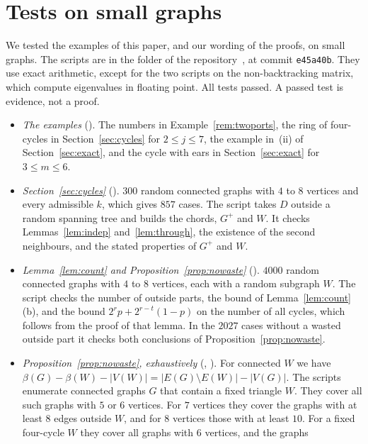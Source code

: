 \documentclass[11pt]{article}
\theoremstyle{definition}
\theoremstyle{remark}
\newcommand{\sm}{\setminus}
\numberwithin{equation}{section}
\begin{document}
\section{Tests on small graphs}\label{app:checks}

We tested the examples of this paper, and our wording of the proofs, on small graphs. The scripts
are in the folder  of the repository~\cite{Repo}, at commit
\texttt{e45a40b}. They use
exact arithmetic, except for the two scripts on the non-backtracking matrix, which compute
eigenvalues in floating point. All tests passed. A passed test is evidence, not a proof.

\begin{itemize}
\item \emph{The examples} (). The numbers in Example~\ref{rem:twoports},
the ring of four-cycles in Section~\ref{sec:cycles} for $2\le j\le7$, the example in~(ii) of
Section~\ref{sec:exact}, and the cycle with ears in Section~\ref{sec:exact} for $3\le m\le6$.
\item \emph{Section~\ref{sec:cycles}} (). $300$ random connected graphs with
$4$ to $8$ vertices and every admissible $k$, which gives $857$ cases. The script takes $D$ outside a
random spanning tree and builds the chords, $G^{+}$ and $W$. It checks Lemmas~\ref{lem:indep}
and~\ref{lem:through}, the existence of the second neighbours, and the stated properties of
$G^{+}$ and $W$.
\item \emph{Lemma~\ref{lem:count} and Proposition~\ref{prop:nowaste}}
(). $4000$ random connected graphs with $4$ to $8$ vertices, each with a
random subgraph $W$. The script checks the number of outside parts, the bound of
Lemma~\ref{lem:count}(b), and the bound $2^{r}p+2^{r-t}(1-p)$ on the number of all cycles, which follows from the proof of
that lemma. In the
$2027$ cases without a wasted outside part it checks both conclusions of
Proposition~\ref{prop:nowaste}.
\item \emph{Proposition~\ref{prop:nowaste}, exhaustively} (,
). For connected $W$ we have
$\beta(G)-\beta(W)-|V(W)|=|E(G)\sm E(W)|-|V(G)|$. The scripts enumerate connected graphs $G$
that contain a fixed triangle $W$. They cover all such graphs with $5$ or $6$ vertices. For $7$
vertices they cover the graphs with at least $8$ edges outside $W$, and for $8$ vertices those with
at least $10$. For a fixed four-cycle $W$ they cover all graphs with $6$ vertices, and the graphs

\end{itemize}
\end{document}
